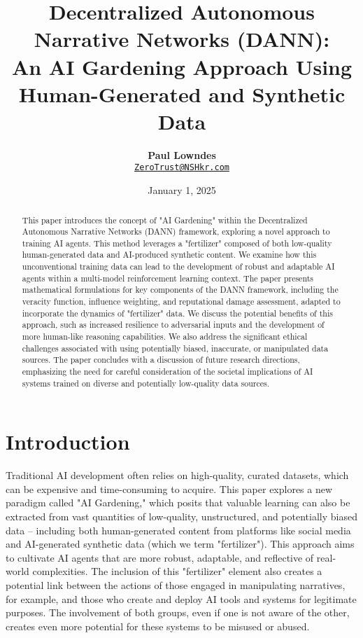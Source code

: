 \documentclass[12pt, a4paper]{article}
\title{\vspace{-2cm}\textbf{Decentralized Autonomous Narrative Networks (DANN): \\
An AI Gardening Approach Using Human-Generated and Synthetic Data}}
\author{\textbf{Paul Lowndes} \\ \href{mailto:ZeroTrust@NSHkr.com}{\texttt{ZeroTrust@NSHkr.com}}}
\date{\small January 1, 2025}
\begin{document}
\maketitle
\vspace{-1.5em}

\begin{abstract}
This paper introduces the concept of "AI Gardening" within the Decentralized Autonomous Narrative Networks (DANN) framework, exploring a novel approach to training AI agents. This method leverages a "fertilizer" composed of both low-quality human-generated data and AI-produced synthetic content. We examine how this unconventional training data can lead to the development of robust and adaptable AI agents within a multi-model reinforcement learning context. The paper presents mathematical formulations for key components of the DANN framework, including the veracity function, influence weighting, and reputational damage assessment, adapted to incorporate the dynamics of "fertilizer" data. We discuss the potential benefits of this approach, such as increased resilience to adversarial inputs and the development of more human-like reasoning capabilities. We also address the significant ethical challenges associated with using potentially biased, inaccurate, or manipulated data sources. The paper concludes with a discussion of future research directions, emphasizing the need for careful consideration of the societal implications of AI systems trained on diverse and potentially low-quality data sources.
\end{abstract}

\section{Introduction}
Traditional AI development often relies on high-quality, curated datasets, which can be expensive and time-consuming to acquire. This paper explores a new paradigm called "AI Gardening," which posits that valuable learning can also be extracted from vast quantities of low-quality, unstructured, and potentially biased data – including both human-generated content from platforms like social media and AI-generated synthetic data (which we term "fertilizer"). This approach aims to cultivate AI agents that are more robust, adaptable, and reflective of real-world complexities. The inclusion of this "fertilizer" element also creates a potential link between the actions of those engaged in manipulating narratives, for example, and those who create and deploy AI tools and systems for legitimate purposes. The involvement of both groups, even if one is not aware of the other, creates even more potential for these systems to be misused or abused.
\end{document}
